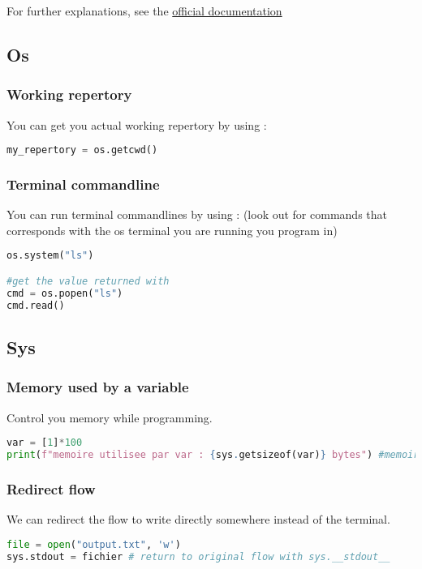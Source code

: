 \documentclass[a4paper, 12pt, titlepage]{scrartcl} %
\begin{document}
For further explanations, see the \href{https://docs.python.org/3/library/hashlib.html}{official documentation}


\subsection{Os}
\subsubsection{Working repertory}
You can get you actual working repertory by using :
\begin{lstlisting}[language=Python]
my_repertory = os.getcwd()
\end{lstlisting}

\subsubsection{Terminal commandline}
You can run terminal commandlines by using : (look out for commands that corresponds with the os terminal you are running you program in)
\begin{lstlisting}[language=Python]
os.system("ls")

#get the value returned with
cmd = os.popen("ls")
cmd.read()
\end{lstlisting}

\subsection{Sys}
\subsubsection{Memory used by a variable}
Control you memory while programming. 
\begin{lstlisting}[language=Python]
var = [1]*100
print(f"memoire utilisee par var : {sys.getsizeof(var)} bytes") #memoire utilisee par var : 856 bytes
\end{lstlisting}

\subsubsection{Redirect flow}
We can redirect the flow to write directly somewhere instead of the terminal.
\begin{lstlisting}[language=Python]
file = open("output.txt", 'w')
sys.stdout = fichier # return to original flow with sys.__stdout__
\end{lstlisting}
\end{document}
